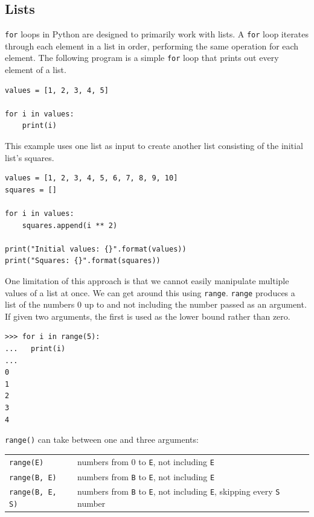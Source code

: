\documentclass[11pt]{cselabheader}
\begin{document}
\subsection{Lists}
\lstinline{for} loops in Python are designed to primarily work with lists. A
\lstinline{for} loop iterates through each element in a list in order,
performing the same operation for each element. The following program is a
simple \lstinline{for} loop that prints out every element of a list.

\begin{lstlisting}[style=python]
values = [1, 2, 3, 4, 5]

for i in values:
    print(i)
\end{lstlisting}

This example uses one list as input to create another list consisting of the
initial list's squares.

\begin{lstlisting}[style=python]
values = [1, 2, 3, 4, 5, 6, 7, 8, 9, 10]
squares = []

for i in values:
    squares.append(i ** 2)

print("Initial values: {}".format(values))
print("Squares: {}".format(squares))
\end{lstlisting}

One limitation of this approach is that we cannot easily manipulate multiple
values of a list at once. We can get around this using \lstinline{range}.
\lstinline{range} produces a list of the numbers 0 up to and not including the
number passed as an argument. If given two arguments, the first is used as the
lower bound rather than zero.

\begin{lstlisting}[style=ipython]
>>> for i in range(5):
...   print(i)
... 
0
1
2
3
4
\end{lstlisting}

\lstinline{range()} can take between one and three arguments:

\begin{tabular}{ll}
  \toprule
  \lstinline!range(E)! & numbers from 0 to \lstinline!E!, not including
  \lstinline!E! \\
  \lstinline!range(B, E)! & numbers from \lstinline!B! to \lstinline!E!, not
  including \lstinline!E! \\
  \lstinline!range(B, E, S)! & numbers from \lstinline!B! to \lstinline!E!, not
  including \lstinline!E!, skipping every \lstinline!S! number \\
  \bottomrule
\end{tabular}
\end{document}
